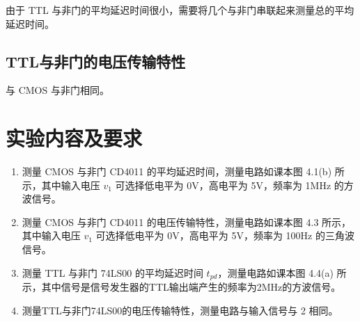 \documentclass[a4paper]{article}
\begin{document}
由于 TTL 与非门的平均延迟时间很小，需要将几个与非门串联起来测量总的平均延迟时间。

\subsection{TTL与非门的电压传输特性}

与 CMOS 与非门相同。

\section{实验内容及要求}

\begin{enumerate}
    \item 测量 CMOS 与非门 CD4011 的平均延迟时间，测量电路如课本图 4.1(b) 所示，其中输入电压 $v_1$ 可选择低电平为 0V，高电平为 5V，频率为 1MHz 的方波信号。
    \item 测量 CMOS 与非门 CD4011 的电压传输特性，测量电路如课本图 4.3 所示，其中输入电压 $v_1$ 可选择低电平为 0V，高电平为 5V，频率为 100Hz 的三角波信号。
    \item 测量 TTL 与非门 74LS00 的平均延迟时间 $t_{{pd}}$，测量电路如课本图 4.4(a) 所示，其中信号是信号发生器的TTL输出端产生的频率为2MHz的方波信号。
    \item 测量TTL与非门74LS00的电压传输特性，测量电路与输入信号与 2 相同。
\end{enumerate}
\end{document}
